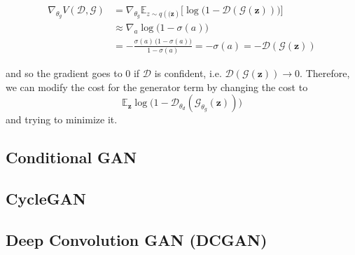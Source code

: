  \begin{align*} 
    \nabla_{\theta_g} V(\mathcal{D}, \mathcal{G}) & = \nabla_{\theta_g} \mathbb{E}_{z \sim q(\mathbf(\mathbf{z})} \big[ \log \big( 1 - \mathcal{D}(\mathcal{G}(\mathbf{z}))\big) \big] \\
                                                  & \approx \nabla_a \log \big( 1 - \sigma(a)\big) \\
                                                  & = - \frac{\sigma(a) \, \big( 1 - \sigma(a)\big)}{1 - \sigma(a)} = - \sigma(a) = - \mathcal{D}(\mathcal{G}(\mathbf{z})) 
  \end{align*} 

  and so the gradient goes to $0$ if $\mathcal{D}$ is confident, i.e. $\mathcal{D}(\mathcal{G}(\mathbf{z})) \rightarrow 0$. Therefore, we can modify the cost for the generator term by changing the cost to 
  \begin{equation}
    \mathbb{E}_{\mathbf{z}} \log \big( 1 - \mathcal{D}_{\theta_d} ( \mathcal{G}_{\theta_g} (\mathbf{z}))\big)
  \end{equation}
  and trying to minimize it. 


  \begin{theorem}[Convergence]
    
  \end{theorem}

\subsection{Conditional GAN} 

\subsection{CycleGAN}

\subsection{Deep Convolution GAN (DCGAN)} 

